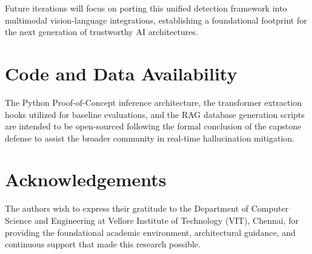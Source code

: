 \documentclass{article}
\begin{document}
Future iterations will focus on porting this unified detection framework into multimodal vision-language integrations, establishing a foundational footprint for the next generation of trustworthy AI architectures.

\section*{Code and Data Availability}
The Python Proof-of-Concept inference architecture, the transformer extraction hooks utilized for baseline evaluations, and the RAG database generation scripts are intended to be open-sourced following the formal conclusion of the capstone defense to assist the broader community in real-time hallucination mitigation.

\section*{Acknowledgements}
The authors wish to express their gratitude to the Department of Computer Science and Engineering at Vellore Institute of Technology (VIT), Chennai, for providing the foundational academic environment, architectural guidance, and continuous support that made this research possible.
\end{document}
